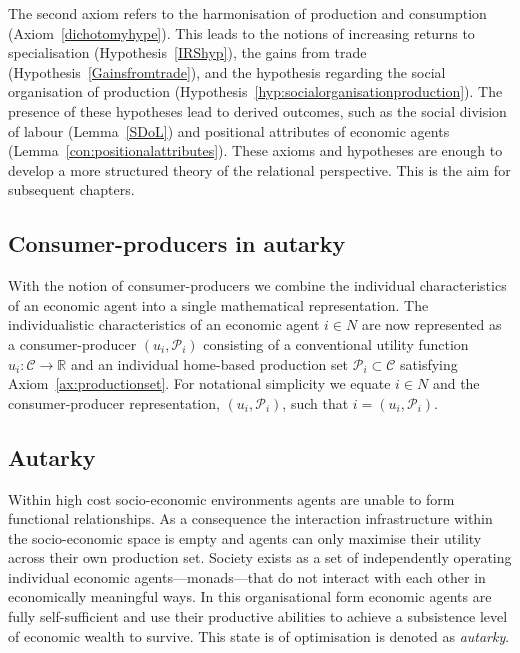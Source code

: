 The second axiom refers to the harmonisation of production and consumption (Axiom~\ref{dichotomyhype}). This leads to the notions of increasing returns to specialisation (Hypothesis~\ref{IRShyp}), the gains from trade (Hypothesis~\ref{Gainsfromtrade}), and the hypothesis regarding the social organisation of production (Hypothesis~\ref{hyp:socialorganisationproduction}). The presence of these hypotheses lead to derived outcomes, such as the social division of labour (Lemma~\ref{SDoL}) and positional attributes of economic agents (Lemma~\ref{con:positionalattributes}). These axioms and hypotheses are enough to develop a more structured theory of the relational perspective. This is the aim for subsequent chapters.

\begin{subappendices}

\section{Consumer-producers in autarky}

With the notion of consumer-producers we combine the individual characteristics of an economic agent into a single mathematical representation. The individualistic characteristics of an economic agent $i \in N$ are now represented as a consumer-producer $(u_{i}, \mathcal{P}_{i})$ consisting of a conventional utility function $u_{i} \colon \mathcal{C} \rightarrow \mathbb{R}$ and an individual home-based production set $\mathcal{P}_{i} \subset \mathcal{C}$ satisfying Axiom~\ref{ax:productionset}. For notational simplicity we equate $i \in N$ and the consumer-producer representation, $(u_{i}, \mathcal{P}_{i})$, such that $i = (u_{i}, \mathcal{P}_{i})$.

\subsection{Autarky}

Within high cost socio-economic environments agents are unable to form functional relationships. As a consequence the interaction infrastructure within the socio-economic space is empty and agents can only maximise their utility across their own production set. Society exists as a set of independently operating individual economic agents---monads---that do not interact with each other in economically meaningful ways. In this organisational form economic agents are fully self-sufficient and use their productive abilities to achieve a subsistence level of economic wealth to survive. This state is of optimisation is denoted as \emph{autarky}.


\end{subappendices}
